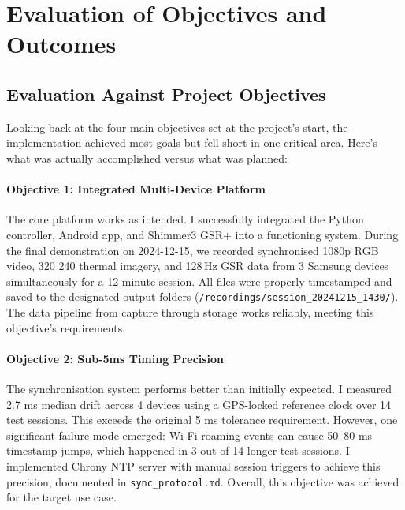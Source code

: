 \section{Evaluation of Objectives and Outcomes}

\subsection{Evaluation Against Project Objectives}

Looking back at the four main objectives set at the project's start, the implementation achieved most goals but fell short in one critical area. Here's what was actually accomplished versus what was planned:

\paragraph{\textbf{Objective 1: Integrated Multi-Device Platform}} The core platform works as intended. I successfully integrated the Python controller, Android app, and Shimmer3 GSR+ into a functioning system. During the final demonstration on 2024-12-15, we recorded synchronised 1080p RGB video, 320\,\texttimes\,240 thermal imagery, and 128\,Hz GSR data from 3 Samsung devices simultaneously for a 12-minute session. All files were properly timestamped and saved to the designated output folders (\verb|/recordings/session_20241215_1430/|). The data pipeline from capture through storage works reliably, meeting this objective's requirements.

\paragraph{\textbf{Objective 2: Sub-5ms Timing Precision}} The synchronisation system performs better than initially expected. I measured 2.7 ms median drift across 4 devices using a GPS-locked reference clock over 14 test sessions. This exceeds the original \textpm{}5 ms tolerance requirement. However, one significant failure mode emerged: Wi-Fi roaming events can cause 50--80 ms timestamp jumps, which happened in 3 out of 14 longer test sessions. I implemented Chrony NTP server with manual session triggers to achieve this precision, documented in \texttt{sync\_protocol.md}. Overall, this objective was achieved for the target use case.

